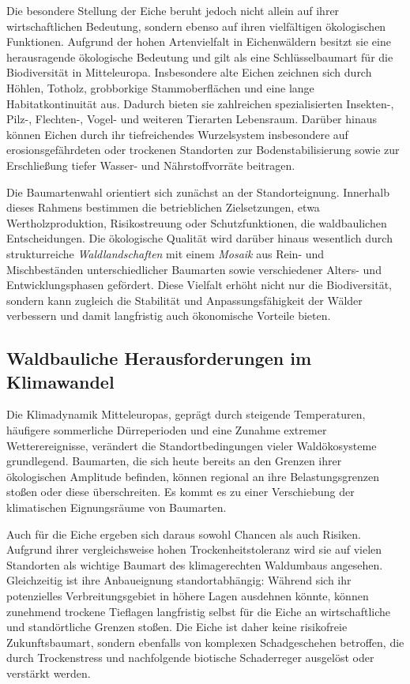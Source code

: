 \documentclass[twocolumn, bibliography=totoc, abstract=true]{scrartcl}
\begin{document}
Die besondere Stellung der Eiche beruht jedoch nicht allein auf ihrer wirtschaftlichen Bedeutung, sondern ebenso auf ihren vielfältigen ökologischen Funktionen. Aufgrund der hohen Artenvielfalt in Eichenwäldern besitzt sie eine herausragende ökologische Bedeutung und gilt als eine Schlüsselbaumart für die Biodiversität in Mitteleuropa. Insbesondere alte Eichen zeichnen sich durch Höhlen, Totholz, grobborkige Stammoberflächen und eine lange Habitatkontinuität aus. Dadurch bieten sie zahlreichen spezialisierten Insekten-, Pilz-, Flechten-, Vogel- und weiteren Tierarten Lebensraum. Darüber hinaus können Eichen durch ihr tiefreichendes Wurzelsystem insbesondere auf erosionsgefährdeten oder trockenen Standorten zur Bodenstabilisierung sowie zur Erschließung tiefer Wasser- und Nährstoffvorräte beitragen.

Die Baumartenwahl orientiert sich zunächst an der Standorteignung. Innerhalb dieses Rahmens bestimmen die betrieblichen Zielsetzungen, etwa Wertholzproduktion, Risikostreuung oder Schutzfunktionen, die waldbaulichen Entscheidungen. Die ökologische Qualität wird darüber hinaus wesentlich durch strukturreiche \emph{Waldlandschaften} mit einem \emph{Mosaik} aus Rein- und Mischbeständen unterschiedlicher Baumarten sowie verschiedener Alters- und Entwicklungsphasen gefördert. Diese Vielfalt erhöht nicht nur die Biodiversität, sondern kann zugleich die Stabilität und Anpassungsfähigkeit der Wälder verbessern und damit langfristig auch ökonomische Vorteile bieten.

\subsection{Waldbauliche Herausforderungen im Klimawandel}

Die Klimadynamik Mitteleuropas, geprägt durch steigende Temperaturen, häufigere sommerliche Dürreperioden und eine Zunahme extremer Wetterereignisse, verändert die Standortbedingungen vieler Waldökosysteme grundlegend. Baumarten, die sich heute bereits an den Grenzen ihrer ökologischen Amplitude befinden, können regional an ihre Belastungsgrenzen stoßen oder diese überschreiten. Es kommt es zu einer Verschiebung der klimatischen Eignungsräume von Baumarten.

Auch für die Eiche ergeben sich daraus sowohl Chancen als auch Risiken. Aufgrund ihrer vergleichsweise hohen Trockenheitstoleranz wird sie auf vielen Standorten als wichtige Baumart des klimagerechten Waldumbaus angesehen. Gleichzeitig ist ihre Anbaueignung standortabhängig: Während sich ihr potenzielles Verbreitungsgebiet in höhere Lagen ausdehnen könnte, können zunehmend trockene Tieflagen langfristig selbst für die Eiche an wirtschaftliche und standörtliche Grenzen stoßen. Die Eiche ist daher keine risikofreie Zukunftsbaumart, sondern ebenfalls von komplexen Schadgeschehen betroffen, die durch Trockenstress und nachfolgende biotische Schaderreger ausgelöst oder verstärkt werden.
\end{document}
